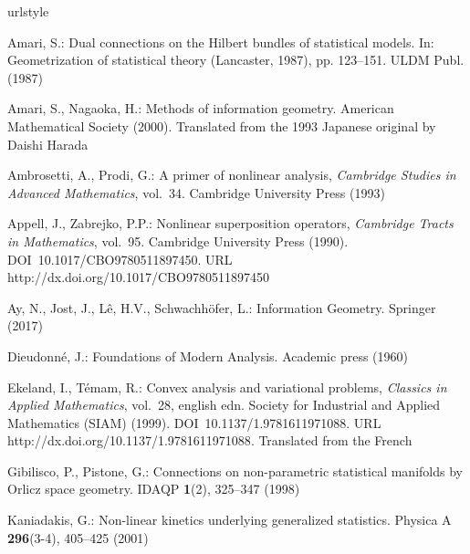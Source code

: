 \documentclass[graybox]{svmult}
\begin{document}
\begin{thebibliography}{10}
\providecommand{\url}[1]{{#1}}
\providecommand{\urlprefix}{URL }
\expandafter\ifx\csname urlstyle\endcsname\relax
  \providecommand{\doi}[1]{DOI~\discretionary{}{}{}#1}\else
  \providecommand{\doi}{DOI~\discretionary{}{}{}\begingroup
  \urlstyle{rm}\Url}\fi

Amari, S.: Dual connections on the {H}ilbert bundles of statistical models.
\newblock In: Geometrization of statistical theory (Lancaster, 1987), pp.
  123--151. ULDM Publ. (1987)

Amari, S., Nagaoka, H.: Methods of information geometry.
\newblock American Mathematical Society (2000).
\newblock Translated from the 1993 Japanese original by Daishi Harada

Ambrosetti, A., Prodi, G.: A primer of nonlinear analysis, \emph{Cambridge
  Studies in Advanced Mathematics}, vol.~34.
\newblock Cambridge University Press (1993)

Appell, J., Zabrejko, P.P.: Nonlinear superposition operators, \emph{Cambridge
  Tracts in Mathematics}, vol.~95.
\newblock Cambridge University Press (1990).
\newblock \doi{10.1017/CBO9780511897450}.
\newblock \urlprefix\url{http://dx.doi.org/10.1017/CBO9780511897450}

Ay, N., Jost, J., L\^e, H.V., Schwachh\"ofer, L.: Information Geometry.
\newblock Springer (2017)

Dieudonn\'e, J.: Foundations of Modern Analysis.
\newblock Academic press (1960)

Ekeland, I., T\'emam, R.: Convex analysis and variational problems,
  \emph{Classics in Applied Mathematics}, vol.~28, english edn.
\newblock Society for Industrial and Applied Mathematics (SIAM) (1999).
\newblock \doi{10.1137/1.9781611971088}.
\newblock \urlprefix\url{http://dx.doi.org/10.1137/1.9781611971088}.
\newblock Translated from the French

Gibilisco, P., Pistone, G.: Connections on non-parametric statistical manifolds
  by {O}rlicz space geometry.
\newblock IDAQP \textbf{1}(2), 325--347 (1998)

Kaniadakis, G.: Non-linear kinetics underlying generalized statistics.
\newblock Physica A \textbf{296}(3-4), 405--425 (2001)


\end{thebibliography}
\end{document}
